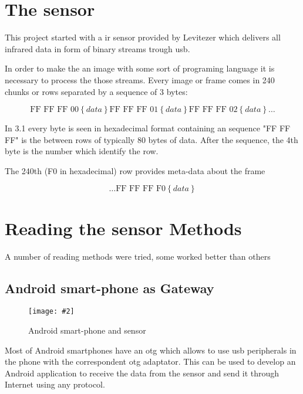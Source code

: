 \documentclass[hidelinks,11pt,a4paper,oneside,article]{memoir}
\numberwithin{equation}{chapter}
\newcommand{\putimage}[3][10] %
{
\begin{figure}[h]
	\centering
	\captionsetup{justification=centering}
	\texttt{[image: \#2]}
	\caption{#3}
	\label{fig:#2}
\end{figure}
}
\begin{document}
\section{The sensor}
This project started with a \gls{ir} sensor provided by Levitezer which delivers all infrared data in form of binary streams trough \gls{usb}.

 In order to make the an image with some sort of programing language it is necessary to process the those streams. Every image or frame comes in 240 chunks or rows separated by a sequence of 3 bytes:

\begin{equation}
\label{eq:stream of data}
\text {FF FF FF 00} \left\lbrace data \right\rbrace 
\text {FF FF FF 01} \left\lbrace data \right\rbrace 
\text {FF FF FF 02} \left\lbrace data \right\rbrace \dots
\end{equation}



In 3.1 every byte is seen in hexadecimal format containing an sequence "FF FF FF" is the between rows of typically 80 bytes of data. After the sequence, the 4th byte is the number which identify the row.

The 240th (F0 in hexadecimal) row provides meta-data about the frame

\begin{equation}
\label{eq:metadata row}
\dots \text {FF FF FF F0} \left\lbrace data \right\rbrace
\end{equation}




\section{Reading the sensor Methods}
A number of reading methods were tried, some worked better than others

\subsection{Android smart-phone as Gateway}

\putimage{android_otg}{Android smart-phone and sensor}

Most of Android smartphones have an \gls{otg} which allows to use usb peripherals in the phone with the correspondent \gls{otg} adaptator. This can be used to develop an Android application to receive the data from the sensor and send it through Internet using any protocol.
\end{document}
